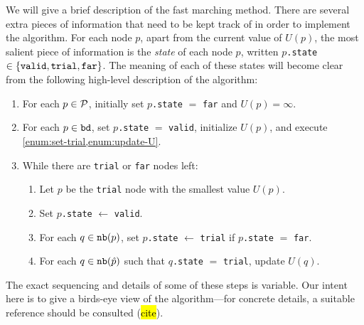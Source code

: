 \documentclass[eikonal.tex]{subfiles}
\begin{document}
We will give a brief description of the fast marching method. There
are several extra pieces of information that need to be kept track of
in order to implement the algorithm. For each node $p$, apart from the
current value of $U(p)$, the most salient piece of information is the
\emph{state} of each node $p$, written $p$\texttt{.state}
$\in \left\{\texttt{valid}, \texttt{trial}, \texttt{far}\right\}$. The meaning
of each of these states will become clear from the following
high-level description of the algorithm:

\begin{center}
  \begin{enumerate}[nolistsep]
  \item For each $p \in \mathcal{P}$, initially set $p$\texttt{.state} $=$
    \texttt{far} and $U(p) = \infty$.
  \item For each $p \in \texttt{bd}$, set $p$\texttt{.state} $=$
    \texttt{valid}, initialize $U(p)$, and execute
    \cref{enum:set-trial,enum:update-U}.
  \item While there are \texttt{trial} or \texttt{far} nodes left:
    \begin{enumerate}[nolistsep]
    \item Let $p$ be the \texttt{trial} node with the smallest value
      $U(p)$.
    \item Set $p$\texttt{.state} $\gets$ \texttt{valid}.
    \item For each $q \in \texttt{nb}(p)$, set $p$\texttt{.state} $\gets$
      \texttt{trial} if $p$\texttt{.state} $=$
      \texttt{far}.\label{enum:set-trial}
    \item For each $q \in \texttt{nb}(\hat{p})$ such that $q$\texttt{.state}
      $=$ \texttt{trial}, update $U(q)$.\label{enum:update-U}
    \end{enumerate}
  \end{enumerate}
\end{center}

The exact sequencing and details of some of these steps is
variable. Our intent here is to give a birds-eye view of the
algorithm---for concrete details, a suitable reference should be
consulted (\hl{cite}).
\end{document}
